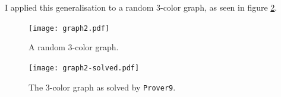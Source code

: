 \documentclass[12pt]{article}
\newcommand{\provernine}{\texttt{Prover9}\xspace}
\begin{document}
I applied this generalisation to a random 3-color graph, as seen in figure \ref{fig:graph2}. \\

\noindent
\begin{minipage}[b]{\textwidth}
	\begin{minipage}[b]{0.50\textwidth}
		\begin{figure}[H]
			\begin{center}
				\texttt{[image: graph2.pdf]}
			\end{center}
			\caption{\label{fig:graph2} A random 3-color graph.}
		\end{figure}
	\end{minipage}
	\begin{minipage}[b]{0.50\textwidth}
		\begin{figure}[H]
			\begin{center}
				\texttt{[image: graph2-solved.pdf]}
			\end{center}
			\caption{\label{fig:graph2} The 3-color graph as solved by \provernine.}
		\end{figure}
	\end{minipage}
\end{minipage}
\end{document}
